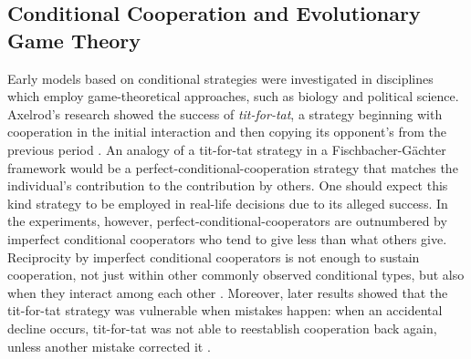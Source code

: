 \documentclass[12pt]{article}
\begin{document}
\subsection*{Conditional Cooperation and Evolutionary Game Theory}

Early models based on conditional strategies were investigated in disciplines which employ game-theoretical approaches, such as biology and political science. Axelrod's research showed the success of \textit{tit-for-tat}, a strategy beginning with cooperation in the initial interaction and then copying its opponent's from the previous period \citep{Axelrod1980a, Axelrod1980b, Axelrod1981-ot}.  An analogy of a tit-for-tat strategy in a Fischbacher-G{\"a}chter framework would be a perfect-conditional-cooperation strategy that matches the individual's contribution to the contribution by others. One should expect this kind strategy to be employed in real-life decisions due to its alleged success. In the experiments, however, perfect-conditional-cooperators are outnumbered by imperfect conditional cooperators who tend to give less than what others give. Reciprocity by imperfect conditional cooperators is not enough to sustain cooperation, not just within other commonly observed conditional types, but also when they interact among each other \citep{Fischbacher2010}.  Moreover, later results showed that the tit-for-tat strategy was vulnerable when mistakes happen: when an accidental decline occurs, tit-for-tat was not able to reestablish cooperation back again, unless another mistake corrected it \citep{Hirshleifer1988-fh, Selten1984-sb, Fundenberg1990-up, Nowak1993-gl}.
\end{document}
